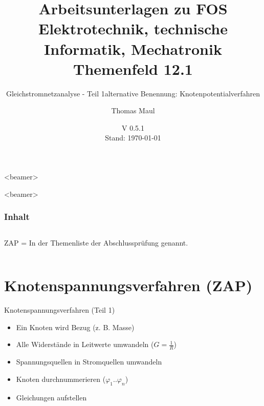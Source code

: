 \documentclass[aspectratio=169, ignorenonframetext]{beamer}
\title{Arbeitsunterlagen zu FOS Elektrotechnik, technische Informatik, Mechatronik Themenfeld 12.1}
\subtitle{Gleichstromnetzanalyse - Teil 1}
\date{V 0.5.1 \\ Stand: \today}%
\institute[BWS Hofheim]{Brühlwiesenschule, Hofheim}
\author{Thomas Maul}
\begin{document}
  \begin{frame}<beamer>
    \titlepage
  \end{frame}


\begin{frame}
  \partpage
\end{frame}
\begin{frame}<beamer>
  \frametitle{Inhalt}
  \begin{columns}
    \tableofcontents[sections={1-4},hidesubsections]%
    ZAP = In der Themenliste der Abschlussprüfung genannt.
    \tableofcontents[sections={5-},hidesubsections]%
  \end{columns}
\end{frame}
\section[KnotenV]{Knotenspannungsverfahren (ZAP)}
\begin{frame}{Knotenspannungsverfahren (Teil 1)}
  \subtitle{alternative Benennung: Knotenpotentialverfahren}
  \begin{itemize}
    \item Ein Knoten wird Bezug (z. B. Masse)
    \item Alle Widerstände in Leitwerte umwandeln ($G = \frac{1}{R}$)
    \item Spannungsquellen in Stromquellen umwandeln
    \item Knoten durchnummerieren ($\varphi_1 .. \varphi_n$)
    \item Gleichungen aufstellen
  \end{itemize}
\end{frame}
\end{document}
